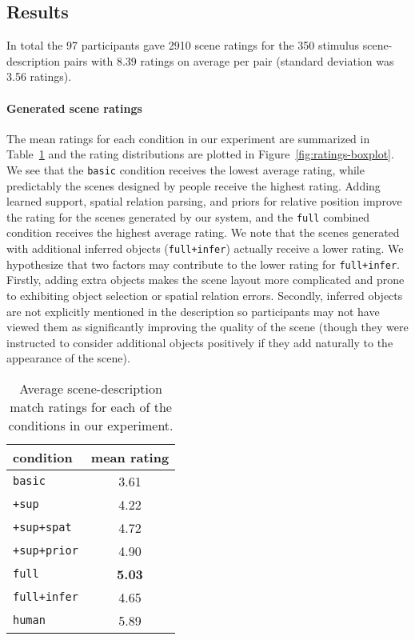 \documentclass{sigchi}
\newcommand{\cbasic}{\texttt{basic}\xspace}
\newcommand{\csup}{\texttt{+sup}\xspace}
\newcommand{\csupspat}{\texttt{+sup+spat}\xspace}
\newcommand{\csupprior}{\texttt{+sup+prior}\xspace}
\newcommand{\cfull}{\texttt{full}\xspace}
\newcommand{\cinfer}{\texttt{full+infer}\xspace}
\newcommand{\cmanual}{\texttt{human}\xspace}
\begin{document}
\subsection{Results}

In total the 97 participants gave 2910 scene ratings for the 350 stimulus scene-description pairs with 8.39 ratings on average per pair (standard deviation was 3.56 ratings).

\paragraph{Generated scene ratings}
The mean ratings for each condition in our experiment are summarized in Table~\ref{tab:humanEvalResults} and the rating distributions are plotted in Figure~\ref{fig:ratings-boxplot}.  We see that the \cbasic condition receives the lowest average rating, while predictably the scenes designed by people receive the highest rating.  Adding learned support, spatial relation parsing, and priors for relative position improve the rating for the scenes generated by our system, and the \cfull combined condition receives the highest average rating.  We note that the scenes generated with additional inferred objects (\cinfer) actually receive a lower rating.  We hypothesize that two factors may contribute to the lower rating for \cinfer. Firstly, adding extra objects makes the scene layout more complicated and prone to exhibiting object selection or spatial relation errors.  Secondly, inferred objects are not explicitly mentioned in the description so participants may not have viewed them as significantly improving the quality of the scene (though they were instructed to consider additional objects positively if they add naturally to the appearance of the scene).

\begin{table}
  \centering
  \begin{tabular}{lc}
    \toprule
    condition  &  mean rating  \\ \midrule
    \cbasic    &     3.61      \\
    \csup      &     4.22      \\
    \csupspat  &     4.72      \\
    \csupprior &     4.90      \\
    \cfull     & \textbf{5.03} \\
    \cinfer    &     4.65      \\ \midrule
    \cmanual   &     5.89      \\ \bottomrule
  \end{tabular}
  \caption{Average scene-description match ratings for each of the conditions in our experiment.}
  \label{tab:humanEvalResults}
\end{table}
\end{document}
